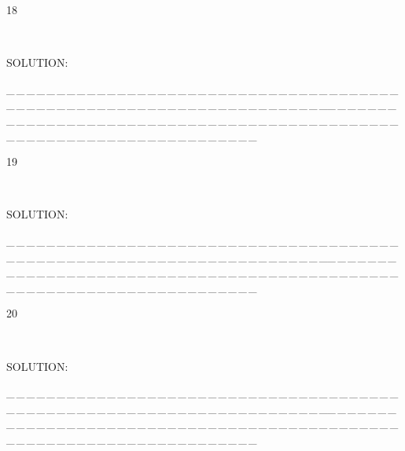 \documentclass[a4paper, 11pt, UTF8]{article}
\begin{document}
\begin{large}
{\timesbf\Large 18} {\timessl\Large 
}\par\quad\,
{\timessl\Large
}\par
{\timesbf S\footnotesize{OLUTION:}}\par\quad

\par
{\tiny \_\,\_\,\_\,\_\,\_\,\_\,\_\,\_\,\_\,\_\,\_\,\_\,\_\,\_\,\_\,\_\,\_\,\_\,\_\,\_\,\_\,\_\,\_\,\_\,\_\,\_\,\_\,\_\,\_\,\_\,\_\,\_\,\_\,\_\,\_\,\_\,\_\,\_\,\_\,\_\,\_\,\_\,\_\,\_\,\_\,\_\,\_\,\_\,\_\,\_\,\_\,\_\,\_\,\_\,\_\,\_\,\_\,\_\,\_\,\_\,\_\,\_\,\_\,\_\,\_\,\_\,\_\,\_\,\_\,\_\,\_\_\,\_\,\_\,\_\,\_\,\_\,\_\,\_\,\_\,\_\,\_\,\_\,\_\,\_\,\_\,\_\,\_\,\_\,\_\,\_\,\_\,\_\,\_\,\_\,\_\,\_\,\_\,\_\,\_\,\_\,\_\,\_\,\_\,\_\,\_\,\_\,\_\,\_\,\_\,\_\,\_\,\_\,\_\,\_\,\_\,\_\,\_\,\_\,\_\,\_\,\_\,\_\,\_\,\_\,\_\,\_\,\_\,\_\,\_\,\_\,\_\,\_\,\_\,\_\,\_\,\_\,\_\,\_\,\_\,\_\,\_}\par

{\timesbf\Large 19} {\timessl\Large 
}\par\quad\,
{\timessl\Large
}\par
{\timesbf S\footnotesize{OLUTION:}}\par\quad

\par
{\tiny \_\,\_\,\_\,\_\,\_\,\_\,\_\,\_\,\_\,\_\,\_\,\_\,\_\,\_\,\_\,\_\,\_\,\_\,\_\,\_\,\_\,\_\,\_\,\_\,\_\,\_\,\_\,\_\,\_\,\_\,\_\,\_\,\_\,\_\,\_\,\_\,\_\,\_\,\_\,\_\,\_\,\_\,\_\,\_\,\_\,\_\,\_\,\_\,\_\,\_\,\_\,\_\,\_\,\_\,\_\,\_\,\_\,\_\,\_\,\_\,\_\,\_\,\_\,\_\,\_\,\_\,\_\,\_\,\_\,\_\,\_\_\,\_\,\_\,\_\,\_\,\_\,\_\,\_\,\_\,\_\,\_\,\_\,\_\,\_\,\_\,\_\,\_\,\_\,\_\,\_\,\_\,\_\,\_\,\_\,\_\,\_\,\_\,\_\,\_\,\_\,\_\,\_\,\_\,\_\,\_\,\_\,\_\,\_\,\_\,\_\,\_\,\_\,\_\,\_\,\_\,\_\,\_\,\_\,\_\,\_\,\_\,\_\,\_\,\_\,\_\,\_\,\_\,\_\,\_\,\_\,\_\,\_\,\_\,\_\,\_\,\_\,\_\,\_\,\_\,\_\,\_}\par

{\timesbf\Large 20} {\timessl\Large 
}\par\quad\,
{\timessl\Large
}\par
{\timesbf S\footnotesize{OLUTION:}}\par\quad

\par
{\tiny \_\,\_\,\_\,\_\,\_\,\_\,\_\,\_\,\_\,\_\,\_\,\_\,\_\,\_\,\_\,\_\,\_\,\_\,\_\,\_\,\_\,\_\,\_\,\_\,\_\,\_\,\_\,\_\,\_\,\_\,\_\,\_\,\_\,\_\,\_\,\_\,\_\,\_\,\_\,\_\,\_\,\_\,\_\,\_\,\_\,\_\,\_\,\_\,\_\,\_\,\_\,\_\,\_\,\_\,\_\,\_\,\_\,\_\,\_\,\_\,\_\,\_\,\_\,\_\,\_\,\_\,\_\,\_\,\_\,\_\,\_\_\,\_\,\_\,\_\,\_\,\_\,\_\,\_\,\_\,\_\,\_\,\_\,\_\,\_\,\_\,\_\,\_\,\_\,\_\,\_\,\_\,\_\,\_\,\_\,\_\,\_\,\_\,\_\,\_\,\_\,\_\,\_\,\_\,\_\,\_\,\_\,\_\,\_\,\_\,\_\,\_\,\_\,\_\,\_\,\_\,\_\,\_\,\_\,\_\,\_\,\_\,\_\,\_\,\_\,\_\,\_\,\_\,\_\,\_\,\_\,\_\,\_\,\_\,\_\,\_\,\_\,\_\,\_\,\_\,\_\,\_}\par


\end{large}
\end{document}
